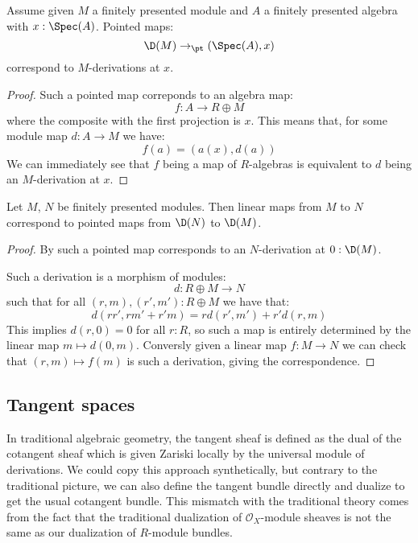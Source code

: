 \begin{lemma}\label{tangent-are-derivation}
Assume given $M$ a finitely presented module and $A$ a finitely presented algebra with $x:\Spec(A)$. Pointed maps:
\[\D(M)\to_\pt (\Spec(A),x)\] 
correspond to $M$-derivations at $x$.
\end{lemma}

\begin{proof}
Such a pointed map correponds to an algebra map:
\[f : A\to R\oplus M\]
where the composite with the first projection is $x$. This means that, for some module map $d:A\to M$ we have:
\[f(a) = (a(x),d(a))\]
We can immediately see that $f$ being a map of $R$-algebras is equivalent to $d$ being an $M$-derivation at $x$.
\end{proof}

\begin{lemma}\label{equivalence-module-infinitesimal}
Let $M$, $N$ be finitely presented modules. Then linear maps from $M$ to $N$ correspond to
pointed maps from $\D(N)$ to $\D(M)$. 
\end{lemma}

\begin{proof}
By  such a pointed map corresponds to an $N$-derivation at $0:\D(M)$.

Such a derivation is a morphism of modules:
\[d:R\oplus M\to N\]
such that for all $(r,m),(r',m'):R\oplus M$ we have that:
\[d(rr',rm'+r'm) = rd(r',m')+r'd(r,m)\]
This implies $d(r,0) = 0$ for all $r : R$, so such a map is entirely determined by the linear map $m\mapsto d(0,m)$. Conversly given a linear map $f:M\to N$ we can check that $(r,m)\mapsto f(m)$ is such a derivation, giving the correspondence.
\end{proof}


\subsection{Tangent spaces}
  \label{remark-sym-dual}

In traditional algebraic geometry, the tangent sheaf is defined as the dual of the cotangent sheaf which is given Zariski locally by the universal module of derivations. We could copy this approach synthetically, but contrary to the traditional picture, we can also define the tangent bundle directly and dualize to get the usual cotangent bundle. This mismatch with the traditional theory comes from the fact that the traditional dualization of $\mathcal O_X$-module sheaves is not the same as our dualization of $R$-module bundles.

